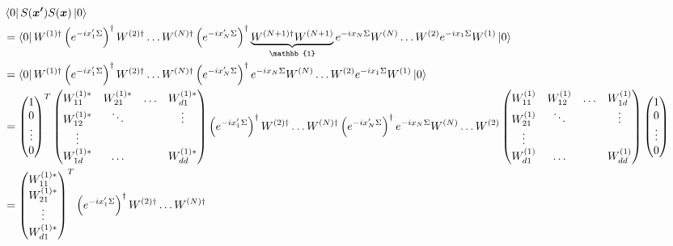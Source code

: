 \documentclass{article}
\begin{document}
\begin{landscape}
\scriptsize
\begin{align}
	&\bra{0}S(\boldsymbol{x'})S(\boldsymbol{x})\ket{0} \\
	&= \bra{0} W^{(1)\dagger} \left(e^{-ix_1'\Sigma}\right)^\dagger W^{(2)\dagger}\ldots W^{(N)\dagger}\left(e^{-ix_N'\Sigma}\right)^\dagger\underbrace{W^{(N+1)\dagger}W^{(N+1)}}_{\mathbb{1}} e^{-ix_N\Sigma}W^{(N)} \ldots W^{(2)}e^{-ix_1\Sigma}W^{(1)}\ket{0} \\
&= \bra{0} W^{(1)\dagger} \left(e^{-ix_1'\Sigma}\right)^\dagger W^{(2)\dagger}\ldots W^{(N)\dagger}\left(e^{-ix_N'\Sigma}\right)^\dagger e^{-ix_N\Sigma}W^{(N)} \ldots W^{(2)}e^{-ix_1\Sigma}W^{(1)}\ket{0} \\
	&= \begin{pmatrix}
		1 \\ 0 \\ \vdots \\ 0
	\end{pmatrix}^T
	\begin{pmatrix}
		W^{(1)*}_{11} & W^{(1)*}_{21} & \ldots & W^{(1)*}_{d1} \\  
		W^{(1)*}_{12} & \ddots & & \vdots \\
		\vdots \\
		W^{(1)*}_{1d} & \ldots &  &W^{(1)*}_{dd}
	\end{pmatrix}
	\left(e^{-ix_1'\Sigma}\right)^\dagger W^{(2)\dagger}\ldots W^{(N)\dagger}\left(e^{-ix_N'\Sigma}\right)^\dagger e^{-ix_N\Sigma}W^{(N)} \ldots W^{(2)}
	\begin{pmatrix}
		W^{(1)}_{11} & W^{(1)}_{12} & \ldots & W^{(1)}_{1d} \\  
		W^{(1)}_{21} & \ddots & & \vdots \\
		\vdots \\
		W^{(1)}_{d1} & \ldots &  &W^{(1)}_{dd}
	\end{pmatrix}
	\begin{pmatrix}
		1 \\ 0 \\ \vdots \\ 0
	\end{pmatrix} \\
	&= \begin{pmatrix}
		W^{(1)*}_{11} \\ W^{(1)*}_{21} \\ \vdots \\ W^{(1)*}_{d1}
	\end{pmatrix}^T
	\left(e^{-ix_1'\Sigma}\right)^\dagger W^{(2)\dagger}\ldots W^{(N)\dagger}

\end{align}
\end{landscape}
\end{document}
